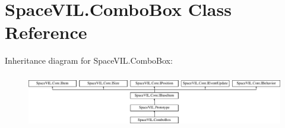 \hypertarget{class_space_v_i_l_1_1_combo_box}{}\section{Space\+V\+I\+L.\+Combo\+Box Class Reference}
\label{class_space_v_i_l_1_1_combo_box}
Inheritance diagram for Space\+V\+I\+L.\+Combo\+Box\+:\begin{figure}[H]
\begin{center}
\leavevmode
\includegraphics[height=2.421622cm]{class_space_v_i_l_1_1_combo_box}
\end{center}
\end{figure}
